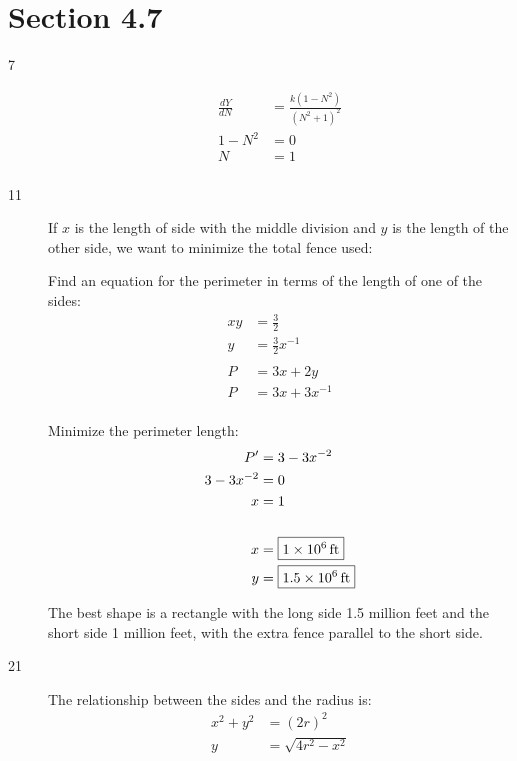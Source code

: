 \documentclass[letterpaper]{exam}
\begin{document}
  \newpage

  \section{Section 4.7} %

  \begin{description}
    \item[7]
      \begin{align*}
        \frac{dY}{dN} &= \frac{ k \left( 1 - N^2 \right) }{ \left( N^2 + 1\right )^2 }
        \\
        1 - N^2 & = 0 \\
        N       & = \boxed{ 1 } \\
      \end{align*}

    \item[11]
      If $x$ is the length of side with the middle division and $y$ is the length of the other side,
      we want to minimize the total fence used:

      Find an equation for the perimeter in terms of the length of one of the sides:
      \begin{align*}
        xy & = \frac{3}{2} \\
        y  & = \frac{3}{2} x^{-1} \\
        \\
        P & = 3x + 2y \\
        P & = 3x + 3x^{-1} \\
      \end{align*}

      Minimize the perimeter length:
      \begin{align*}
        P'          & = 3 - 3x^{-2} \\
        3 - 3x^{-2} & = 0 \\
        x           & = 1 \\
        \\
        x  & = \boxed{ \unit[1 \times 10^6]{ft} } \\
        y  & = \boxed{ \unit[1.5 \times 10^6]{ft} } \\
      \end{align*}

      The best shape is a rectangle with the long side 1.5 million feet and the short side 1 million
      feet, with the extra fence parallel to the short side.

    \item[21]
      The relationship between the sides and the radius is:
      \begin{align*}
        x^2 + y^2 & = (2r)^2 \\
        y         & = \sqrt{4r^2 - x^2} \\
      \end{align*}


\end{description}
\end{document}
